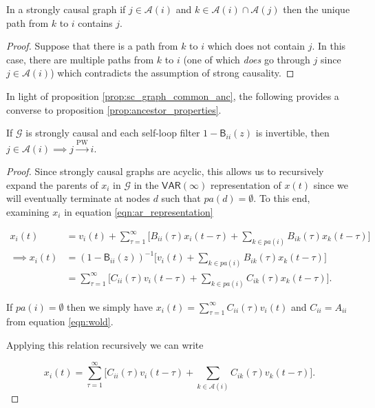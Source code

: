 \documentclass[12pt]{article}
\def\pwgc{\overset{\text{PW}}{\rightarrow}}  %
\def\gcg{\mathcal{G}}  %
\def\VAR{\mathsf{VAR}}  %
\def\B{\mathsf{B}}  %
\newcommand{\pa}[1]{pa(#1)}  %
\newcommand{\anc}[1]{\mathcal{A}(#1)}  %
\begin{document}
\begin{proposition}
  \label{prop:sc_graph_common_anc}
  In a strongly causal graph if $j \in \anc{i}$ and $k \in \anc{i} \cap \anc{j}$ then the unique path from $k$ to $i$ contains $j$.
\end{proposition}
\begin{proof}
  Suppose that there is a path from $k$ to $i$ which does not contain $j$.  In this case, there are multiple paths from $k$ to $i$ (one of which \textit{does} go through $j$ since $j \in \anc{i}$) which contradicts the assumption of strong causality.
\end{proof}


In light of proposition \ref{prop:sc_graph_common_anc}, the following provides a converse to proposition \ref{prop:ancestor_properties}.

\begin{proposition}
  \label{lem:pwgc_anc}
  If $\gcg$ is strongly causal and each self-loop filter
  $1 - \B_{ii}(z)$ is invertible, then $j \in \anc{i} \implies j \pwgc i$.
\end{proposition}
\begin{proof}
  Since strongly causal graphs are acyclic, this allows us to
  recursively expand the parents of $x_i$ in $\gcg$ in the
  $\VAR(\infty)$ representation of $x(t)$ since we will eventually
  terminate at nodes $d$ such that $\pa{d} = \emptyset$.  To this end,
  examining $x_i$ in equation \ref{eqn:ar_representation}

  \begin{align*}
    x_i(t) &= v_i(t) + \sum_{\tau = 1}^\infty \big[ B_{ii}(\tau)x_i(t - \tau) + \sum_{k \in \pa{i}} B_{ik}(\tau)x_k(t - \tau)\big]\\
    \implies x_i(t) &= (1 - \B_{ii}(z))^{-1} \big[v_i(t) + \sum_{k \in \pa{i}} B_{ik}(\tau)x_k(t - \tau) \big]\\
    &= \sum_{\tau = 1}^\infty \big[C_{ii}(\tau)v_i(t - \tau) + \sum_{k \in \pa{i}} C_{ik}(\tau)x_k(t - \tau)\big].
  \end{align*}

  If $\pa{i} = \emptyset$ then we simply have
  $x_i(t) = \sum_{\tau = 1}^\infty C_{ii}(\tau)v_i(t)$ and
  $C_{ii} = A_{ii}$ from equation \ref{eqn:wold}.

  Applying this relation recursively we can write

  \begin{equation*}
    x_i(t) = \sum_{\tau = 1}^\infty\big[C_{ii}(\tau)v_i(t - \tau) + \sum_{k \in \anc{i}}C_{ik}(\tau)v_k(t - \tau) \big].
  \end{equation*}

\end{proof}
\end{document}

